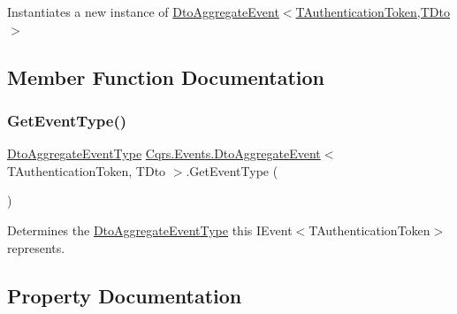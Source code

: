 Instantiates a new instance of \hyperlink{classCqrs_1_1Events_1_1DtoAggregateEvent_a9741e3dae73892ee98408547ea953d4d_a9741e3dae73892ee98408547ea953d4d}{Dto\+Aggregate\+Event$<$\+T\+Authentication\+Token,\+T\+Dto$>$} 



\subsection{Member Function Documentation}
\mbox{\label{classCqrs_1_1Events_1_1DtoAggregateEvent_af5bed152d656cb758312f499f87e69de_af5bed152d656cb758312f499f87e69de}} 
\subsubsection{\texorpdfstring{Get\+Event\+Type()}{GetEventType()}}
{\footnotesize\ttfamily \hyperlink{namespaceCqrs_1_1Events_a2a32e13adeac92f5a93966cd8ee2d39a_a2a32e13adeac92f5a93966cd8ee2d39a}{Dto\+Aggregate\+Event\+Type} \hyperlink{classCqrs_1_1Events_1_1DtoAggregateEvent}{Cqrs.\+Events.\+Dto\+Aggregate\+Event}$<$ T\+Authentication\+Token, T\+Dto $>$.Get\+Event\+Type (\begin{DoxyParamCaption}{ }\end{DoxyParamCaption})}



Determines the \hyperlink{namespaceCqrs_1_1Events_a2a32e13adeac92f5a93966cd8ee2d39a_a2a32e13adeac92f5a93966cd8ee2d39a}{Dto\+Aggregate\+Event\+Type} this I\+Event$<$\+T\+Authentication\+Token$>$ represents. 



\subsection{Property Documentation}
\mbox{\label{classCqrs_1_1Events_1_1DtoAggregateEvent_a536e92af26632a9590e2ed590232cfcf_a536e92af26632a9590e2ed590232cfcf}} 
